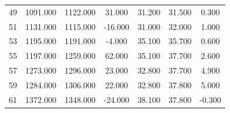 \begin{table}[t]
\begin{tabular}{ccccccc}
49 & 1091.000 & 1122.000 & 31.000 & 31.200 & 31.500 & 0.300 \\
51 & 1131.000 & 1115.000 & -16.000 & 31.000 & 32.000 & 1.000 \\
53 & 1195.000 & 1191.000 & -4.000 & 35.100 & 35.700 & 0.600 \\
55 & 1197.000 & 1259.000 & 62.000 & 35.100 & 37.700 & 2.600 \\
57 & 1273.000 & 1296.000 & 23.000 & 32.800 & 37.700 & 4.900 \\
59 & 1284.000 & 1306.000 & 22.000 & 32.800 & 37.800 & 5.000 \\
61 & 1372.000 & 1348.000 & -24.000 & 38.100 & 37.800 & -0.300 \\
\hline
\end{tabular}
\end{table}
